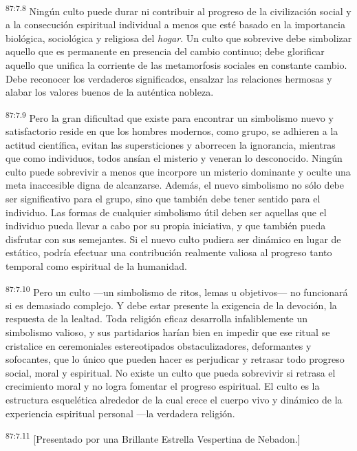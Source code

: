 \par
\textsuperscript{87:7.8} Ningún culto puede durar ni contribuir al progreso de la civilización social y a la consecución espiritual individual a menos que esté basado en la importancia biológica, sociológica y religiosa del \textit{hogar}. Un culto que sobrevive debe simbolizar aquello que es permanente en presencia del cambio continuo; debe glorificar aquello que unifica la corriente de las metamorfosis sociales en constante cambio. Debe reconocer los verdaderos significados, ensalzar las relaciones hermosas y alabar los valores buenos de la auténtica nobleza.

\par
\textsuperscript{87:7.9} Pero la gran dificultad que existe para encontrar un simbolismo nuevo y satisfactorio reside en que los hombres modernos, como grupo, se adhieren a la actitud científica, evitan las supersticiones y aborrecen la ignorancia, mientras que como individuos, todos ansían el misterio y veneran lo desconocido. Ningún culto puede sobrevivir a menos que incorpore un misterio dominante y oculte una meta inaccesible digna de alcanzarse. Además, el nuevo simbolismo no sólo debe ser significativo para el grupo, sino que también debe tener sentido para el individuo. Las formas de cualquier simbolismo útil deben ser aquellas que el individuo pueda llevar a cabo por su propia iniciativa, y que también pueda disfrutar con sus semejantes. Si el nuevo culto pudiera ser dinámico en lugar de estático, podría efectuar una contribución realmente valiosa al progreso tanto temporal como espiritual de la humanidad.

\par
\textsuperscript{87:7.10} Pero un culto ---un simbolismo de ritos, lemas u objetivos--- no funcionará si es demasiado complejo. Y debe estar presente la exigencia de la devoción, la respuesta de la lealtad. Toda religión eficaz desarrolla infaliblemente un simbolismo valioso, y sus partidarios harían bien en impedir que ese ritual se cristalice en ceremoniales estereotipados obstaculizadores, deformantes y sofocantes, que lo único que pueden hacer es perjudicar y retrasar todo progreso social, moral y espiritual. No existe un culto que pueda sobrevivir si retrasa el crecimiento moral y no logra fomentar el progreso espiritual. El culto es la estructura esquelética alrededor de la cual crece el cuerpo vivo y dinámico de la experiencia espiritual personal ---la verdadera religión.

\par
\textsuperscript{87:7.11} [Presentado por una Brillante Estrella Vespertina de Nebadon.]
